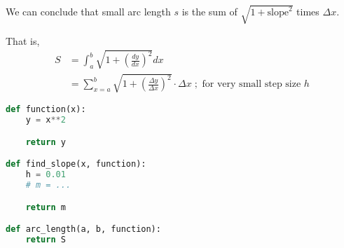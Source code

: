 \documentclass[11pt]{article}
\begin{document}
We can conclude that small arc length \(s\) is the sum of  \(\sqrt{1 + \text{slope}^2}\) times \(\Delta x\).

That is,
\[
\begin{aligned}
    S &= \int_a^b \sqrt{1 + \left( \frac{dy}{dx} \right)^2} dx \\
    &= \sum_{x=a}^b \sqrt{1 + \left( \frac{\Delta y}{ \Delta x} \right)^2} \cdot \Delta x \; ; \text{ for very small step size } h
\end{aligned}
\]

\begin{lstlisting}[language=Python]
def function(x):
    y = x**2

    return y

def find_slope(x, function):
    h = 0.01
    # m = ... 

    return m

def arc_length(a, b, function):
    return S
\end{lstlisting}
\end{document}
